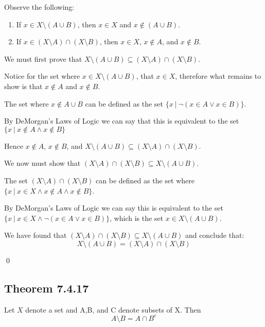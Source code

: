 \documentclass{article}
\begin{document}
Observe the following:
\begin{enumerate}
	\item If $x \in X \setminus (A \cup B)$, then $x \in X$ and $x \not\in (A \cup B)$.
	\item If $x \in (X \setminus A) \cap (X \setminus B)$, then $x \in X$, $x \not\in A$, and $x \not\in B$.
\end{enumerate}

We must first prove that $X \setminus (A \cup B) \subseteq (X \setminus A) \cap (X \setminus B)$.

Notice for the set where $x \in X \setminus (A \cup B)$, that $x \in X$, therefore what remains to show is that $x \not\in A$ and $x \not\in B$.

The set where $x \not\in A \cup B$ can be defined as the set  $\{x\ |\ \lnot(x \in A \lor x \in B)\}$.

By DeMorgan's Laws of Logic we can say that this is equivalent to the set 
$\{x\ |\ x \not\in A \land x \not\in B\}$

Hence $x \not\in A$, $x \not\in B$, and $X \setminus (A \cup B) \subseteq (X \setminus A) \cap (X \setminus B)$.

We now must show that $(X \setminus A) \cap (X \setminus B) \subseteq X \setminus (A \cup B)$.

The set $(X \setminus A) \cap (X \setminus B)$ can be defined as the set where $\{x\ |\ x \in X \land x \not\in A \land x \not\in B \}$.

By DeMorgan's Laws of Logic we can say this is equivalent to the set $\{x\ |\ x \in X \land \lnot(x \in A \lor x \in B) \}$, which is the set $x \in X \setminus (A \cup B)$.

We have found that $(X \setminus A) \cap (X \setminus B) \subseteq X \setminus (A \cup B)$ and conclude that:
\begin{equation}
	X \setminus (A \cup B) = (X \setminus A) \cap (X \setminus B)
\end{equation}

\qed



\pagebreak
\subsection{Theorem 7.4.17}
Let $X$ denote a set and A,B, and C denote subsets of X. Then
\begin{equation}
	A \setminus B = A \cap B^c
\end{equation}
\end{document}
